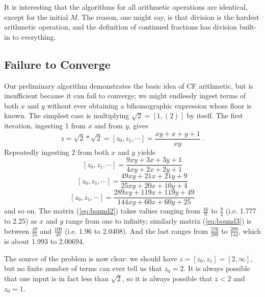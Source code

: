 \documentclass[11pt, oneside]{amsart}   	%
\newcommand{\bihom}[8]{{\frac{#1 xy + #2 x + #3 y + #4}{#5 xy + #6 x + #7 y + #8}}}
\renewcommand{\:}{\negthickspace:\negthickspace}
\begin{document}
It is interesting that the algorithms for all arithmetic operations are identical, except for the initial $M$. The reason, one might say, is
that division is the hardest arithmetic operation, and the definition of continued fractions has division built-in to everything.



\subsection{Failure to Converge}\label{sec:FailToConverge}
Our preliminary algorithm demonstrates the basic idea of CF arithmetic, but is insufficient because it can fail to converge;
we might endlessly ingest terms of both $x$ and $y$ without ever obtaining a bihomographic expression whose floor is known. The
simplest case is multiplying $\sqrt{2} = [1,(2)]$ by itself. The first iteration, ingesting 1 from $x$ and from $y$, gives
\begin{equation*}
z = \sqrt{2}*\sqrt{2} = [z_0,z_1, \cdots] = \frac{xy+x+y+1}{xy} \ . %
\end{equation*}
Repeatedly ingesting 2 from both $x$ and $y$ yields
\begin{equation}\label{eq:bound2}
[z_0,z_1, \cdots]  =  \bihom{9}{3}{3}{1}{4}{2}{2}{1}
\end{equation}
\begin{equation}\label{eq:bound3}
[z_0,z_1, \cdots]  =  \bihom{49}{21}{21}{9}{25}{20}{10}{4}
\end{equation}
\begin{equation}\label{eq:bound4}
[z_0,z_1, \cdots]  =  \bihom{289}{119}{119}{49}{144}{60}{60}{25}
\end{equation}
and so on. The matrix (\ref{eq:bound2}) takes values ranging from $\frac{16}{9}$ to $\frac{9}{4}$ (i.e. 1.777 to 2.25)
as $x$ and $y$ range from one to infinity;
similarly matrix (\ref{eq:bound3}) is between $\frac{49}{25}$ and $\frac{100}{49}$ (i.e. 1.96 to 2.0408).
And the last ranges from $\frac{576}{289}$ to $\frac{289}{144}$, which is about 1.993 to 2.00694.

The source of the problem is now clear: we should have $z=[z_0,z_1]=[2,\infty]$, but no finite number of terms can ever tell us that
$z_0=2$. It is always possible that one input is in fact less than $\sqrt{2}$, so it is always possible that $z<2$ and $z_0=1$.
\end{document}
